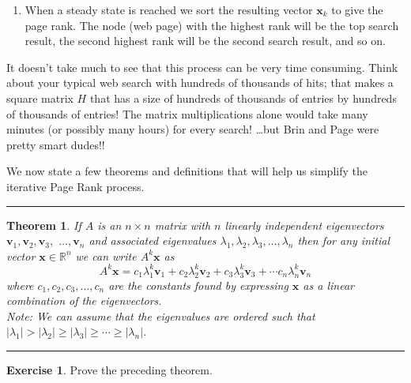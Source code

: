 \documentclass[
]{book}
\providecommand{\tightlist}{%
  \setlength{\itemsep}{0pt}\setlength{\parskip}{0pt}}
\newtheorem{theorem}{Theorem}[chapter]
\theoremstyle{definition}
\theoremstyle{definition}
\theoremstyle{definition}
\newtheorem{exercise}{Exercise}[chapter]
\theoremstyle{remark}
\begin{document}
\begin{enumerate}
\def\labelenumi{\arabic{enumi}.}
\setcounter{enumi}{3}
\tightlist
\item
  When a steady state is reached we sort the resulting vector \(\boldsymbol{x}_k\)
  to give the page rank. The node (web page) with the highest rank
  will be the top search result, the second highest rank will be the
  second search result, and so on.
\end{enumerate}

It doesn't take much to see that this process can be very time
consuming. Think about your typical web search with hundreds of
thousands of hits; that makes a square matrix \(H\) that has a size of
hundreds of thousands of entries by hundreds of thousands of entries!
The matrix multiplications alone would take many minutes (or possibly
many hours) for every search! \ldots but Brin and Page were pretty smart
dudes!!

We now state a few theorems and definitions that will help us simplify
the iterative Page Rank process.

\begin{center}\rule{0.5\linewidth}{0.5pt}\end{center}

\begin{theorem}
\protect\hypertarget{thm:eigen-expand}{}{\label{thm:eigen-expand} }If
\(A\) is an \(n \times n\) matrix with \(n\) linearly independent eigenvectors
\(\boldsymbol{v}_1,  \boldsymbol{v}_2, \boldsymbol{v}_3,\) \(\ldots, \boldsymbol{v}_n\) and associated eigenvalues
\(\lambda_1, \lambda_2,  \lambda_3, \ldots, \lambda_n\) then for any initial vector
\(\boldsymbol{x} \in \mathbb{R}^n\) we can write \(A^k \boldsymbol{x}\) as
\[A^k \boldsymbol{x} = c_1 \lambda_1^k \boldsymbol{v}_1 + c_2 \lambda_2^k \boldsymbol{v}_2 + c_3 \lambda_3^k \boldsymbol{v}_3 +
        \cdots c_n \lambda_n^k \boldsymbol{v}_n\] where
\(c_1, c_2, c_3, \ldots, c_n\) are the constants found by expressing \(\boldsymbol{x}\)
as a linear combination of the eigenvectors.\\
Note: We can assume that the eigenvalues are ordered such that
\(|\lambda_1| > |\lambda_2| \ge |\lambda_3| \ge \cdots \ge |\lambda_n|\).
\end{theorem}

\begin{center}\rule{0.5\linewidth}{0.5pt}\end{center}

\begin{exercise}
\protect\hypertarget{exr:unnamed-chunk-400}{}{\label{exr:unnamed-chunk-400} }Prove the preceding theorem.
\end{exercise}
\end{document}
